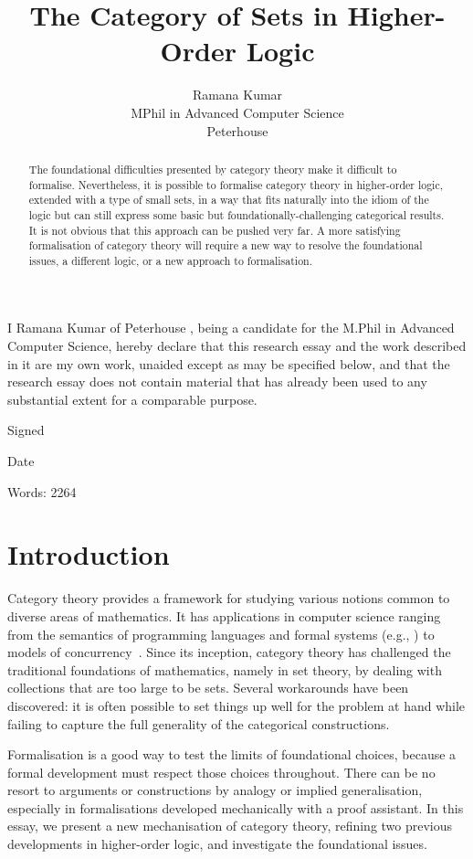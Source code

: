 \documentclass[twoside,titlepage,11pt]{article}
\title{The Category of Sets in Higher-Order Logic}
\author{Ramana Kumar\\MPhil in Advanced Computer Science\\Peterhouse}
\begin{document}
\maketitle
\thispagestyle{empty}
I Ramana Kumar of Peterhouse , being a candidate for the M.Phil in Advanced Computer Science, hereby declare that this research essay and the work described in it are my own work, unaided except as may be specified below, and that the research essay does not contain material that has already been used to any substantial extent for a comparable purpose.

\vspace{1em}
\noindent Signed

\vspace{1em}
\noindent Date

\vspace{2em}
\noindent Words: 2264
\begin{abstract}%
The foundational difficulties presented by category theory make it difficult to formalise.
Nevertheless, it is possible to formalise category theory in higher-order logic, extended with a type of small sets, in a way that fits naturally into the idiom of the logic but can still express some basic but foundationally-challenging categorical results.
It is not obvious that this approach can be pushed very far.
A more satisfying formalisation of category theory will require a new way to resolve the foundational issues, a different logic, or a new approach to formalisation.
\end{abstract}%
\section{Introduction}%
Category theory provides a framework for studying various notions common to diverse areas of mathematics.
It has applications in computer science ranging from the semantics of programming languages and formal systems (e.g., \cite{CroleCT,JacobsCLTT}) to models of concurrency~\cite{DBLP:conf/csl/CattaniW96}.
Since its inception, category theory has challenged the traditional foundations of mathematics, namely in set theory, by dealing with collections that are too large to be sets. 
Several workarounds have been discovered: it is often possible to set things up well for the problem at hand while failing to capture the full generality of the categorical constructions.

Formalisation is a good way to test the limits of foundational choices, because a formal development must respect those choices throughout.
There can be no resort to arguments or constructions by analogy or implied generalisation, especially in formalisations developed mechanically with a proof assistant.
In this essay, we present a new mechanisation of category theory, refining two previous developments in higher-order logic, and investigate the foundational issues.
\end{document}
